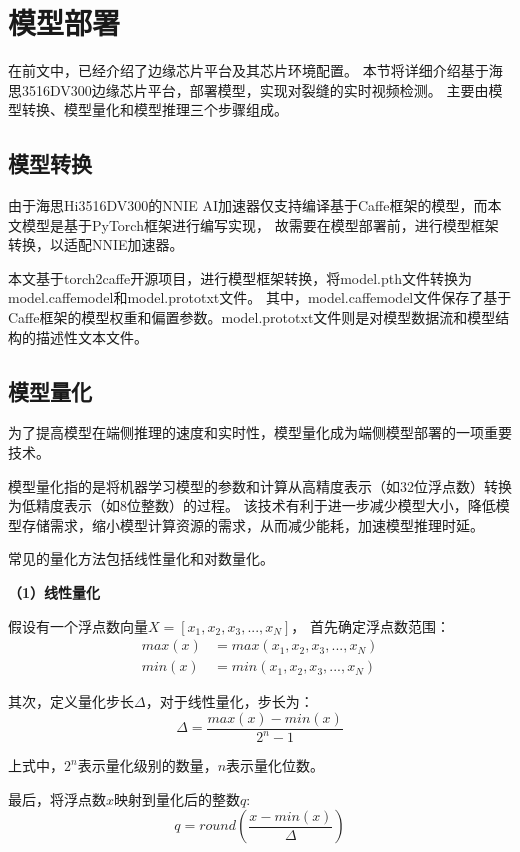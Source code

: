 \section{模型部署}
在前文中，已经介绍了边缘芯片平台及其芯片环境配置。
本节将详细介绍基于海思3516DV300边缘芯片平台，部署模型，实现对裂缝的实时视频检测。
主要由模型转换、模型量化和模型推理三个步骤组成。

\subsection{模型转换}
由于海思Hi3516DV300的NNIE AI加速器仅支持编译基于Caffe框架的模型，而本文模型是基于PyTorch框架进行编写实现，
故需要在模型部署前，进行模型框架转换，以适配NNIE加速器。

本文基于torch2caffe开源项目，进行模型框架转换，将model.pth文件转换为model.caffemodel和model.prototxt文件。
其中，model.caffemodel文件保存了基于Caffe框架的模型权重和偏置参数。model.prototxt文件则是对模型数据流和模型结构的描述性文本文件。

\subsection{模型量化}
为了提高模型在端侧推理的速度和实时性，模型量化成为端侧模型部署的一项重要技术。

模型量化指的是将机器学习模型的参数和计算从高精度表示（如32位浮点数）转换为低精度表示（如8位整数）的过程。
该技术有利于进一步减少模型大小，降低模型存储需求，缩小模型计算资源的需求，从而减少能耗，加速模型推理时延。

常见的量化方法包括线性量化和对数量化。

\textbf{（1）线性量化}

假设有一个浮点数向量$X = [x_1,x_2,x_3,...,x_N]$，
首先确定浮点数范围：
\begin{align}
    max(x) &= max(x_1,x_2,x_3,...,x_N) \\
    min(x) &= min(x_1,x_2,x_3,...,x_N) 
\end{align}

其次，定义量化步长$\Delta$，对于线性量化，步长为：
\begin{equation}
    \Delta = \frac{max(x)-min(x)}{2^n - 1}
\end{equation}

上式中，$2^n$表示量化级别的数量，$n$表示量化位数。

最后，将浮点数$x$映射到量化后的整数$q$:
\begin{equation}
    q = round(\frac{x-min(x)}{\Delta})
\end{equation}


